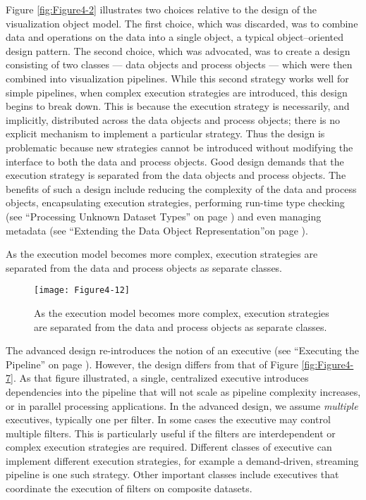 Figure \ref{fig:Figure4-2} illustrates two choices relative to the design of the visualization object model. The first choice, which was discarded, was to combine data and operations on the data into a single object, a typical object--oriented design pattern. The second choice, which was advocated, was to create a design consisting of two classes --- data objects and process objects --- which were then combined into visualization pipelines. While this second strategy works well for simple pipelines, when complex execution strategies are introduced, this design begins to break down. This is because the execution strategy is necessarily, and implicitly, distributed across the data objects and process objects; there is no explicit mechanism to implement a particular strategy. Thus the design is problematic because new strategies cannot be introduced without modifying the interface to both the data and process objects. Good design demands that the execution strategy is separated from the data objects and process objects. The benefits of such a design include reducing the complexity of the data and process objects, encapsulating execution strategies, performing run-time type checking (see ``Processing Unknown Dataset Types'' on page \pageref{subsec:processing_unknown_dataset_types}) and even managing metadata (see ``Extending the Data Object Representation''on page  \pageref{subsec:extending_data_object_representation}).

As the execution model becomes more complex, execution strategies are separated from the data and process objects as separate classes.

\begin{wrapfigure}{r}{0.4\textwidth}
  \centering
  \texttt{[image: Figure4-12]}\\
  \caption{As the execution model becomes more complex, execution strategies are separated from the data and process objects as separate classes.}\label{fig:Figure4-12}
\end{wrapfigure}

The advanced design re-introduces the notion of an executive (see ``Executing the Pipeline'' on page \pageref{sec:executing_pipeline}). However, the design differs from that of Figure \ref{fig:Figure4-7}. As that figure illustrated, a single, centralized executive introduces dependencies into the pipeline that will not scale as pipeline complexity increases, or in parallel processing applications. In the advanced design, we assume \emph{multiple} executives, typically one per filter. In  some cases the executive may control multiple filters. This is particularly useful if the filters are interdependent or complex execution strategies are required. Different classes of executive can implement different execution strategies, for example a demand-driven, streaming pipeline is one such strategy. Other important classes include executives that coordinate the execution of filters on composite datasets.

